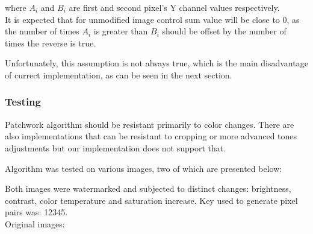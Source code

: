 \documentclass[a4paper, 12pt]{article}
\begin{document}
    where $A_i$ and $B_i$ are first and second pixel's Y channel values respectively. \\
    
    It is expected that for unmodified image control sum value will be close to 0, as the number of times $A_i$ is greater than $B_i$ should be offset by the number of times the reverse is true.
    
    Unfortunately, this assumption is not always true, which is the main disadvantage of currect implementation, as can be seen in the next section.
	
	\subsubsection{Testing}

    Patchwork algorithm should be resistant primarily to color changes. There are also implementations that can be resistant to cropping or more advanced tones adjustments but our implementation does not support that.
    
    Algorithm was tested on various images, two of which are presented below:
    
    \begin{figure}[H]
        \centering
        \qquad
        \label{}
    \end{figure}
    
    Both images were watermarked and subjected to distinct changes: brightness, contrast, color temperature and saturation increase. Key used to generate pixel pairs was: 12345. \\
    
    Original images:
    
    \begin{figure}[H]
        \centering
        \qquad
        \label{}
    \end{figure}
    
\end{document}
